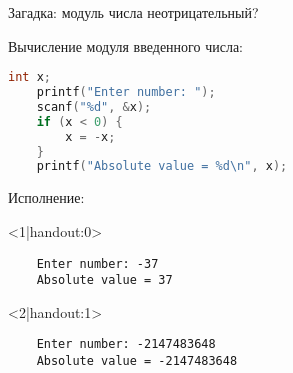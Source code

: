 \begin{frame}[fragile]{Загадка: модуль числа неотрицательный?}

  \begin{block}{Вычисление модуля введенного числа:}
    \begin{lstlisting}[language=C]
    int x;
    printf("Enter number: ");
    scanf("%d", &x);
    if (x < 0) {
        x = -x;
    }
    printf("Absolute value = %d\n", x);
    \end{lstlisting}
  \end{block}

  \begin{block}{Исполнение:}
    \begin{onlyenv}<1|handout:0>\begin{lstlisting}
    Enter number: -37
    Absolute value = 37
    \end{lstlisting}\end{onlyenv}
    \begin{onlyenv}<2|handout:1>\begin{lstlisting}
    Enter number: -2147483648
    Absolute value = -2147483648
    \end{lstlisting}\end{onlyenv}
  \end{block}

\end{frame}

